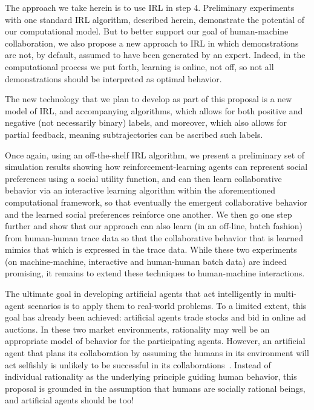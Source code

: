The approach we take herein is to use IRL in step 4.  Preliminary
experiments with one standard IRL algorithm, described herein,
demonstrate the potential of our computational model.
%
But to better support our goal of human-machine collaboration, we also
propose a new approach to IRL in which demonstrations are not, by
default, assumed to have been generated by an expert.  Indeed, in the
computational process we put forth, learning is online, not off, so
not all demonstrations should be interpreted as optimal behavior.

The new technology that we plan to develop as part of this proposal is
a new model of IRL, and accompanying algorithms, which allows for both
positive and negative (not necessarily binary) labels, and moreover,
which also allows for partial feedback, meaning subtrajectories can be
ascribed such labels.

Once again, using an off-the-shelf IRL algorithm, we present a
preliminary set of simulation results showing how
reinforcement-learning agents
can represent social preferences using a social utility function, and
can then learn collaborative behavior via an interactive learning
algorithm within the aforementioned computational framework, so that
eventually the emergent collaborative behavior and the learned social
preferences reinforce one another.  We then go one step further and
show that our approach can also learn (in an off-line, batch fashion)
from human-human trace data so that the collaborative behavior that is
learned mimics that which is expressed in the trace data.  While these
two experiments (on machine-machine, interactive and human-human batch
data) are indeed promising, it remains to extend these techniques to
human-machine interactions.

The ultimate goal in developing artificial agents that act
intelligently in multi-agent scenarios is to apply them to real-world
problems.  To a limited extent, this goal has already been achieved:
artificial agents trade stocks and bid in online ad auctions.  In
these two market environments, rationality may well be an appropriate
model of behavior for the participating agents.  However,
an artificial agent that plans its collaboration by assuming the
humans in its environment will act selfishly is unlikely to be
successful in its collaborations~\cite{Camerer:2003,kahnemanst82}.
Instead of individual rationality as the underlying principle guiding
human behavior, this proposal is grounded in the assumption that
humans are socially rational beings, and artificial agents should be
too!  


